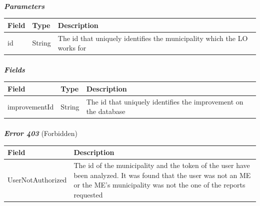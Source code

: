 						\paragraph{}
							\textcolor{myBlue}{\textit{\textbf{Parameters}}}
							\vspace{-2mm}
							\begin{table}[!h]
								\begin{tabular}{L{0.15\textwidth}L{0.15\textwidth}L{0.58\textwidth}}
									\toprule
									\textbf{Field} & \textbf{Type} & \textbf{Description} \\
									\midrule
								 	id & String & The id that uniquely identifies the municipality which the LO works for \\
								 	\bottomrule
								\end{tabular}
							\end{table}
						\paragraph{}
						\vspace{-5mm}
							\textcolor{myBlue}{\textit{\textbf{Fields}}}
							\vspace{-2mm}
							\begin{table}[!h]
								\begin{tabular}{L{0.2\textwidth}L{0.15\textwidth}L{0.53\textwidth}}
									\toprule
									\textbf{Field} & \textbf{Type} & \textbf{Description} \\
									\midrule
								 	improvementId & String & The id that uniquely identifies the improvement on the database \\
								 	\bottomrule
								\end{tabular}
							\end{table}
						\paragraph{}
							\textcolor{myRed}{\textit{\textbf{Error 403}}} (Forbidden)
							\vspace{-2mm}
							\begin{table}[!h]
								\begin{tabular}{L{0.3\textwidth}L{0.62\textwidth}}
									\toprule
									\textbf{Field} & \textbf{Description} \\
									\midrule
								  	UserNotAuthorized & The id of the municipality and the token of the user have been analyzed. It was found that the user was not an ME or the ME's municipality was not the one of the reports requested \\
								 	\bottomrule
								\end{tabular}
							\end{table}
							
